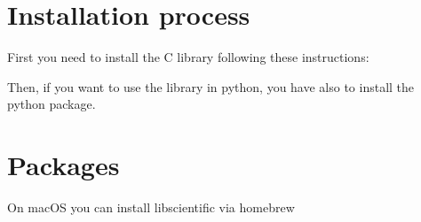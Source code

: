 \documentclass[letterpaper,10pt,english]{sphinxmanual}
\begin{document}
\section{Installation process}
\label{\detokenize{Install:installation-process}}
\sphinxAtStartPar
First you need to install the C library following these instructions:

\begin{sphinxVerbatim}[commandchars=\\\{\}]
  
 
 
 
  
 
  
\end{sphinxVerbatim}

\sphinxAtStartPar
Then, if you want to use the library in python, you have also to install the python package.

\begin{sphinxVerbatim}[commandchars=\\\{\}]
 
  


  
\end{sphinxVerbatim}


\section{Packages}
\label{\detokenize{Install:packages}}
\sphinxAtStartPar
On macOS you can install libscientific via homebrew

\begin{sphinxVerbatim}[commandchars=\\\{\}]
   
   
\end{sphinxVerbatim}
\end{document}
